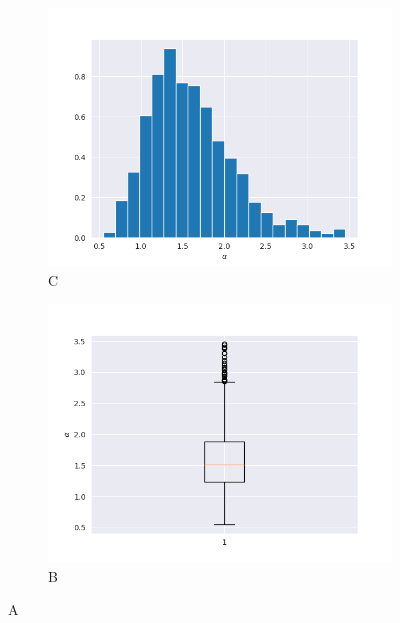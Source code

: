 \documentclass{article}
\begin{document}
		\begin{figure}
			\begin{subfigure}{.5\textwidth}
				\centering
				\includegraphics[width=1\linewidth]{images/cdf_alpha_hist.png}
				\caption{C}
			\end{subfigure}
			\begin{subfigure}[r]{.5\textwidth}
				\centering
				\includegraphics[width=1\linewidth]{images/cdf_alpha_boxplot.png}
				\caption{B}
			\end{subfigure}
			\caption{A}
		\end{figure}
\end{document}
